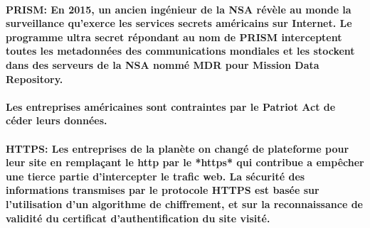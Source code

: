 \paragraph{
  PRISM: En 2015, un ancien ingénieur de la NSA révèle au monde la surveillance qu'exerce les services secrets américains sur Internet. Le programme ultra secret répondant au nom de PRISM interceptent toutes les metadonnées des communications mondiales et les stockent dans des serveurs de la NSA nommé MDR pour Mission Data Repository.
}

\paragraph{
  Les entreprises américaines sont contraintes par le Patriot Act de céder leurs données.
}

\paragraph{
  HTTPS: Les entreprises de la planète on changé de plateforme pour leur site en remplaçant le http par le *https* qui contribue a empêcher une tierce partie d'intercepter le trafic web. La sécurité des informations transmises par le protocole HTTPS est basée sur l'utilisation d'un algorithme de chiffrement, et sur la reconnaissance de validité du certificat d'authentification du site visité.
}
